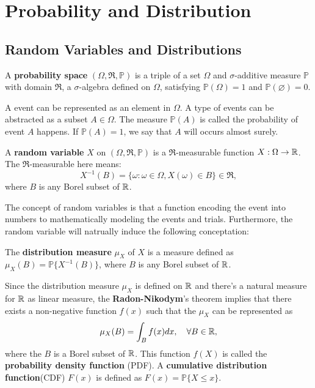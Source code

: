 
\section{Probability and Distribution}
\subsection{Random Variables and Distributions}
\begin{definition}
A \textbf{probability space} $(\Omega,\mathfrak{R},\mathbb{P})$ is a triple of a set $\Omega$ and $\sigma$-additive measure $\mathbb{P}$ with domain $\mathfrak{R}$, a $\sigma$-algebra defined on $\Omega$, satisfying $\mathbb{P}(\Omega) = 1$ and $\mathbb{P}(\varnothing)=0$.
\end{definition}
A event can be represented as an element in $\Omega$. A type of events can be abstracted as a subset $A\in\Omega$. The measure $\mathbb{P}(A)$ is called the probability of event $A$ happens. If $\mathbb{P}(A)=1$, we say that $A$ will occurs almost surely.

\begin{definition}
A \textbf{random variable} $X$ on $(\Omega,\mathfrak{R},\mathbb{P})$ is a $\mathfrak{R}$-measurable function $X:\Omega\to\mathbb{R}$. The $\mathfrak{R}$-measurable here means:
	\begin{equation}
		X^{-1}(B)=\{\omega:\omega\in\Omega, X(\omega)\in B\}\in\mathfrak{R},
	\end{equation}
where $B$ is any Borel subset of $\mathbb{R}$.
\end{definition}
The concept of random variables is that a function encoding the event into numbers to mathematically modeling the events and trials. Furthermore, the random variable will natrually induce the following conceptation:

\begin{definition}
The \textbf{distribution measure} $\mu_X$ of $X$ is a measure defined as $\mu_X(B)=\mathbb{P}\{X^{-1}(B)\}$, where $B$ is any Borel subset of $\mathbb{R}$.
\end{definition}
Since the distribution measure $\mu_X$ is defined on $\mathbb{R}$ and there's a natural measure for $\mathbb{R}$ as linear measure, the \textbf{Radon-Nikodym}'s theorem implies that there exists a non-negative function $f(x)$ such that the $\mu_X$ can be represented as
\begin{equation}
\mu_X(B) = \int_B f(x)d x, \quad\forall B\in\mathbb{R},
\end{equation} 
where the $B$ is a Borel subset of $\mathbb{R}$. This function $f(X)$ is called the \textbf{probability density function} (PDF). A \textbf{cumulative distribution function}(CDF) $F(x)$ is defined as $F(x)=\mathbb{P}\{X\le x\}$.

